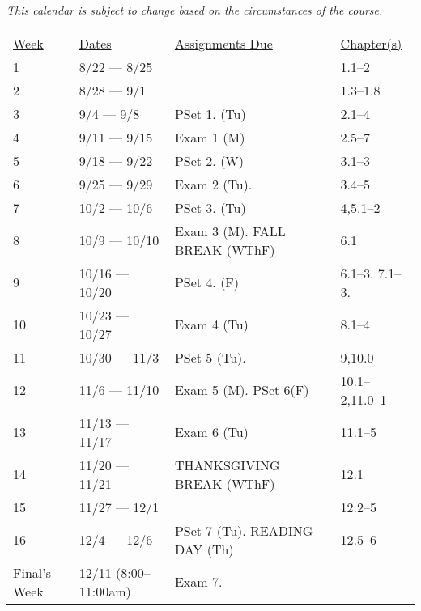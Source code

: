 \documentclass[nobib]{tufte-handout}
\begin{document}
\textit{This calendar is subject to change based on the circumstances of the course.}

\begin{center}
\begin{tabular}{llll}

\underline{Week} & \underline{Dates} & \underline{Assignments Due} & \underline{Chapter(s)}\\
1 & 8/22 --- 8/25 & & 1.1--2 \\
2 & 8/28 --- 9/1 & & 1.3--1.8 \\
3 & 9/4 --- 9/8 & PSet 1. (Tu) & 2.1--4 \\
4 & 9/11 --- 9/15 & Exam 1 (M) & 2.5--7 \\
5 & 9/18 --- 9/22 & PSet 2. (W) & 3.1--3 \\
6 & 9/25 --- 9/29 & Exam 2 (Tu). & 3.4--5 \\
7 & 10/2 --- 10/6 &  PSet 3. (Tu) & 4,5.1--2  \\
8 & 10/9 --- 10/10 & Exam 3 (M). FALL BREAK (WThF) &  6.1\\
9 & 10/16 --- 10/20 & PSet 4. (F) & 6.1--3. 7.1--3. \\
10 & 10/23 --- 10/27 & Exam 4 (Tu) & 8.1--4 \\
11 & 10/30 --- 11/3 &  PSet 5 (Tu). & 9,10.0 \\
12 & 11/6 --- 11/10 &  Exam 5 (M). PSet 6(F) & 10.1--2,11.0--1 \\
13 & 11/13 --- 11/17 & Exam 6 (Tu) & 11.1--5 \\
14 & 11/20 --- 11/21 &  THANKSGIVING BREAK (WThF) & 12.1 \\
15 & 11/27 --- 12/1 &  & 12.2--5\\
16 & 12/4 --- 12/6 & PSet 7 (Tu).  READING DAY (Th) & 12.5--6\\
Final's Week & 12/11 (8:00--11:00am) & Exam 7. &  \\
\end{tabular}
\end{center}
\end{document}
